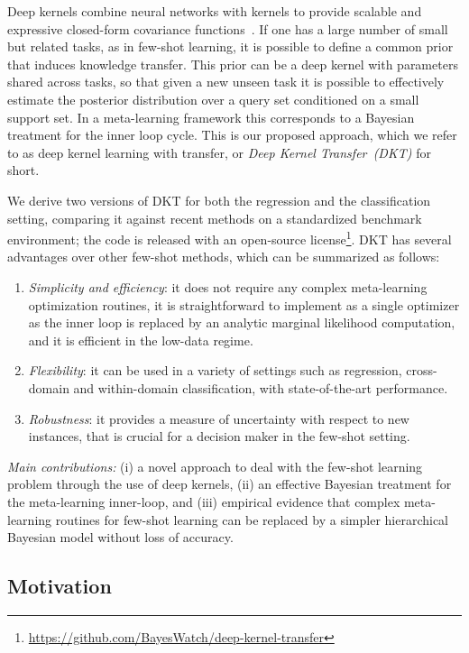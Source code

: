 \documentclass{article}
\begin{document}
Deep kernels combine neural networks with kernels to provide scalable and expressive closed-form covariance functions~\citep{hinton2008using, wilson2016deep}. 
If one has a large number of small but related tasks, as in few-shot learning, it is possible to define a common prior that induces knowledge transfer. This prior can be a deep kernel with parameters shared across tasks, so that given a new unseen task it is possible to effectively estimate the posterior distribution over a query set conditioned on a small support set. In a meta-learning framework \citep{hospedales2020meta} this corresponds to a Bayesian treatment for the inner loop cycle.
This is our proposed approach, which we refer to as deep kernel learning with transfer, or \emph{Deep Kernel Transfer~(DKT)} for short. 

We derive two versions of DKT for both the regression and the classification setting, comparing it against recent methods on a standardized benchmark environment; the code is released with an open-source license\footnote{\url{https://github.com/BayesWatch/deep-kernel-transfer}}.
DKT has several advantages over other few-shot methods, which can be summarized as follows:

\begin{enumerate}
    \item \emph{Simplicity and efficiency}: it does not require any complex meta-learning optimization routines, it is straightforward to implement as a single optimizer as the inner loop is replaced by an analytic marginal likelihood computation, and it is efficient in the low-data regime.
    \item \emph{Flexibility}: it can be used in a variety of settings such as regression, cross-domain and within-domain classification, with state-of-the-art performance.
    \item \emph{Robustness}: it provides a measure of uncertainty with respect to new instances, that is crucial for a decision maker in the few-shot setting.
\end{enumerate}

\emph{Main contributions:} (i) a novel approach to deal with the few-shot learning problem through the use of deep kernels, (ii) an effective Bayesian treatment for the meta-learning inner-loop, and (iii) empirical evidence that complex meta-learning routines for few-shot learning can be replaced by a simpler hierarchical Bayesian model without loss of accuracy.

\subsection{Motivation}
\end{document}
